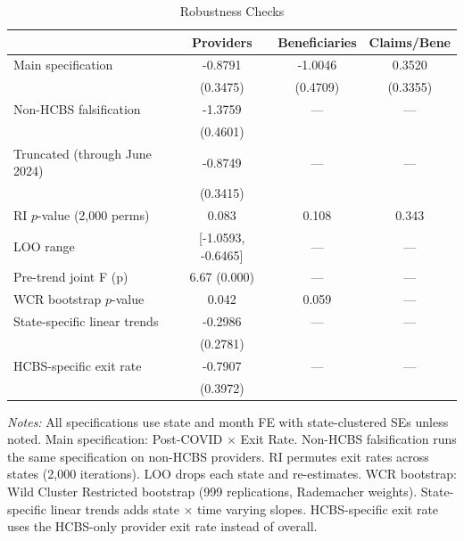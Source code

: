\begin{table}[t]
\centering
\caption{Robustness Checks}
\label{tab:robustness}
\begin{tabular}{lccc}
\toprule
 & Providers & Beneficiaries & Claims/Bene \\
\midrule
Main specification & -0.8791 & -1.0046 & 0.3520 \\
 & (0.3475) & (0.4709) & (0.3355) \\
Non-HCBS falsification & -1.3759 & --- & --- \\
 & (0.4601) & & \\
Truncated (through June 2024) & -0.8749 & --- & --- \\
 & (0.3415) & & \\
\midrule
RI $p$-value (2,000 perms) & 0.083 & 0.108 & 0.343 \\
LOO range & [-1.0593, -0.6465] & --- & --- \\
Pre-trend joint F (p) & 6.67 (0.000) & --- & --- \\
WCR bootstrap $p$-value & 0.042 & 0.059 & --- \\
State-specific linear trends & -0.2986 & --- & --- \\
 & (0.2781) & & \\
HCBS-specific exit rate & -0.7907 & --- & --- \\
 & (0.3972) & & \\
\bottomrule
\end{tabular}
\begin{minipage}{0.9\textwidth}
\vspace{0.2cm}
\footnotesize \textit{Notes:} All specifications use state and month FE with state-clustered SEs unless noted. Main specification: Post-COVID $\times$ Exit Rate. Non-HCBS falsification runs the same specification on non-HCBS providers. RI permutes exit rates across states (2,000 iterations). LOO drops each state and re-estimates. WCR bootstrap: Wild Cluster Restricted bootstrap (999 replications, Rademacher weights). State-specific linear trends adds state $\times$ time varying slopes. HCBS-specific exit rate uses the HCBS-only provider exit rate instead of overall.
\end{minipage}
\end{table}
